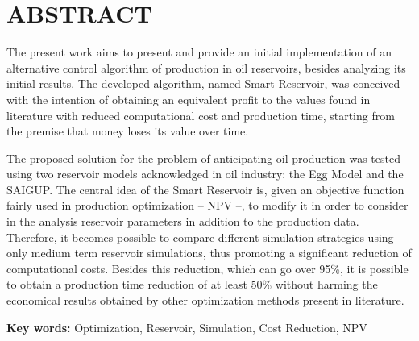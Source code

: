 \chapter[ABSTRACT]{ABSTRACT}
{
The present work aims to present and provide an initial implementation of an alternative control algorithm of production in oil reservoirs, besides analyzing its initial results. The developed algorithm, named Smart Reservoir, was conceived with the intention of obtaining an equivalent profit to the values found in literature with reduced computational cost and production time, starting from the premise that money loses its value over time.

The proposed solution for the problem of anticipating oil production was tested using two reservoir models acknowledged in oil industry: the Egg Model and the SAIGUP. The central idea of the Smart Reservoir is, given an objective function fairly used in production optimization -- NPV --, to modify it in order to consider in the analysis reservoir parameters in addition to the production data. Therefore, it becomes possible to compare different simulation strategies using only medium term reservoir simulations, thus promoting a significant reduction of computational costs. Besides this reduction, which can go over 95\%, it is possible to obtain a production time reduction of at least 50\% without harming the economical results obtained by other optimization methods present in literature.
 
\textbf{Key words:} Optimization, Reservoir, Simulation, Cost Reduction, NPV
}